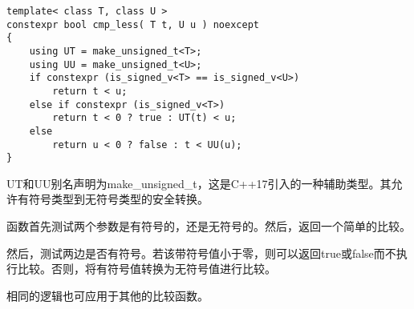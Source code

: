 \begin{lstlisting}[style=styleCXX]
template< class T, class U >
constexpr bool cmp_less( T t, U u ) noexcept
{
	using UT = make_unsigned_t<T>;
	using UU = make_unsigned_t<U>;
	if constexpr (is_signed_v<T> == is_signed_v<U>)
		return t < u;
	else if constexpr (is_signed_v<T>)
		return t < 0 ? true : UT(t) < u;
	else
		return u < 0 ? false : t < UU(u);
}
\end{lstlisting}

UT和UU别名声明为make\_unsigned\_t，这是C++17引入的一种辅助类型。其允许有符号类型到无符号类型的安全转换。

函数首先测试两个参数是有符号的，还是无符号的。然后，返回一个简单的比较。

然后，测试两边是否有符号。若该带符号值小于零，则可以返回true或false而不执行比较。否则，将有符号值转换为无符号值进行比较。

相同的逻辑也可应用于其他的比较函数。
















